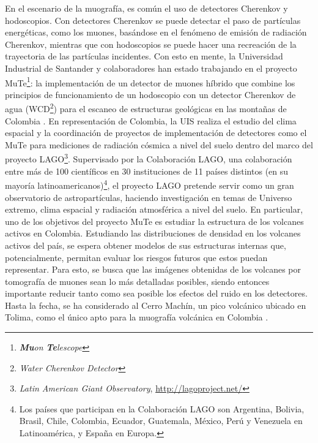 \documentclass[12pt]{report}
\begin{document}
En el escenario de la muografía, es común el uso de detectores Cherenkov y hodoscopios. Con detectores Cherenkov se puede detectar el paso de partículas energéticas, como los muones, basándose en el fenómeno de emisión de radiación Cherenkov, mientras que con hodoscopios se puede hacer una recreación de la trayectoria de las partículas incidentes. Con esto en mente, la Universidad Industrial de Santander y colaboradores han estado trabajando en el proyecto MuTe\footnote{\textit{\textbf{Mu}on \textbf{Te}lescope}}: la implementación de un detector de muones híbrido que combine los principios de funcionamiento de un hodoscopio con un detector Cherenkov de agua (WCD\footnote{\textit{Water Cherenkov Detector}}) para el escaneo de estructuras geológicas en las montañas de Colombia \cite{pena2019calibration}\cite{rodriguez2018minimute}. En representación de Colombia, la UIS realiza el estudio del clima espacial y la coordinación de proyectos de implementación de detectores como el MuTe para mediciones de radiación cósmica a nivel del suelo dentro del marco del proyecto LAGO\footnote{\textit{Latin American Giant Observatory}, \url{http://lagoproject.net/}}. Supervisado por la Colaboración LAGO, una colaboración entre más de 100 científicos en 30 instituciones de 11 países distintos (en su mayoría latinoamericanos)\footnote{Los países que participan en la Colaboración LAGO son Argentina, Bolivia, Brasil, Chile, Colombia, Ecuador, Guatemala, México, Perú y Venezuela en Latinoamérica, y España en Europa.}, el proyecto LAGO pretende servir como un gran observatorio de astropartículas, haciendo investigación en temas de Universo extremo, clima espacial y radiación atmosférica a nivel del suelo. En particular, uno de los objetivos del proyecto MuTe es estudiar la estructura de los volcanes activos en Colombia. Estudiando las distribuciones de densidad en los volcanes activos del país, se espera obtener modelos de sus estructuras internas que, potencialmente, permitan evaluar los riesgos futuros que estos puedan representar. Para esto, se busca que las imágenes obtenidas de los volcanes por tomografía de muones sean lo más detalladas posibles, siendo entonces importante reducir tanto como sea posible los efectos del ruido en los detectores. Hasta la fecha, se ha considerado al Cerro Machín, un pico volcánico ubicado en Tolima, como el único apto para la muografía volcánica en Colombia \cite{vesga2018inversion}\cite{balaguera2017astroparticle}.
\end{document}
